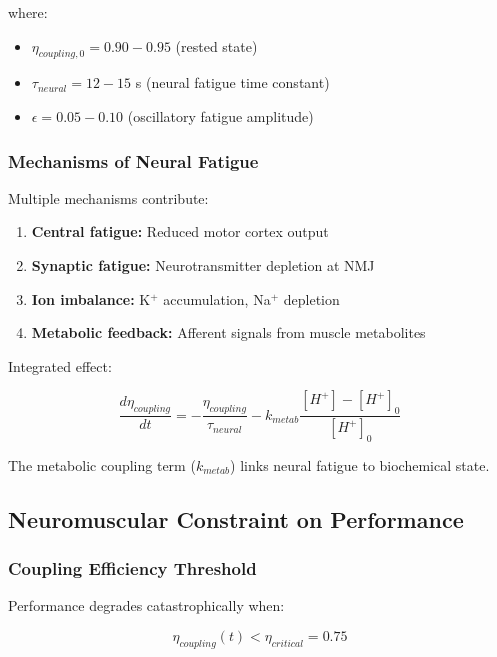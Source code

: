 where:
\begin{itemize}
\item $\eta_{coupling,0} = 0.90-0.95$ (rested state)
\item $\tau_{neural} = 12-15$ s (neural fatigue time constant)
\item $\epsilon = 0.05-0.10$ (oscillatory fatigue amplitude)
\end{itemize}

\subsubsection{Mechanisms of Neural Fatigue}

Multiple mechanisms contribute:

\begin{enumerate}
\item \textbf{Central fatigue:} Reduced motor cortex output
\item \textbf{Synaptic fatigue:} Neurotransmitter depletion at NMJ
\item \textbf{Ion imbalance:} K$^+$ accumulation, Na$^+$ depletion
\item \textbf{Metabolic feedback:} Afferent signals from muscle metabolites
\end{enumerate}

Integrated effect:

\begin{equation}
\frac{d\eta_{coupling}}{dt} = -\frac{\eta_{coupling}}{\tau_{neural}} - k_{metab} \frac{[H^+] - [H^+]_0}{[H^+]_0}
\label{eq:coupling_degradation_rate}
\end{equation}

The metabolic coupling term ($k_{metab}$) links neural fatigue to biochemical state.

\subsection{Neuromuscular Constraint on Performance}

\subsubsection{Coupling Efficiency Threshold}

Performance degrades catastrophically when:

\begin{equation}
\eta_{coupling}(t) < \eta_{critical} = 0.75
\label{eq:coupling_threshold}
\end{equation}

